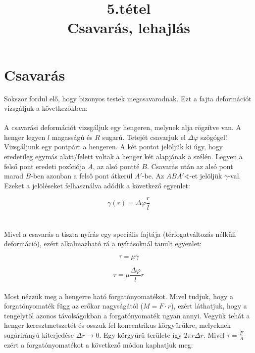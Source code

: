 \documentclass[a4paper]{article}
\title{%
  5.tétel \\
  \large Csavarás, lehajlás}
\date{}
\begin{document}
\maketitle

\section{Csavarás}

Sokszor fordul elő, hogy bizonyos testek megcsavarodnak. Ezt a fajta deformációt vizsgáljuk a következőkben:
\\
\\
A csavarási deformációt vizsgáljuk egy hengeren, melynek alja rögzítve van. A henger legyen $l$ magasságú és $R$ sugarú. Tetejét csavarjuk el $\Delta\varphi$ szögógel!
\\
Vizsgáljunk egy pontpárt a hengeren. A két pontot jelöljük ki úgy, hogy eredetileg egymás alatt/felett voltak a henger két alapjának a szélén. Legyen a felső pont eredeti pozíciója $A$, az alsó pontté $B$. Csavarás után az alsó pont marad $B$-ben azonban a felső pont átkerül $A'$-be. Az $ABA'\sphericalangle$-et jelöljük $\gamma$-val.
\\
Ezeket a jelöléseket felhasználva adódik a következő egyenlet:

\begin{equation}
	\gamma(r)=\Delta\varphi\frac{r}{l}
\end{equation}
\\
\\
Mivel a csavarás a tiszta nyírás egy speciális fajtája (térfogatváltozás nélküli deformáció), ezért alkalmazható rá a nyírásoknál tanult egyenlet: 

\begin{equation}
\tau=\mu\gamma
\end{equation}

\begin{equation}
\tau=\mu\frac{\Delta\varphi}{l}r
\end{equation}
\\
Most nézzük meg a hengerre ható forgatónyomatékot. Mivel tudjuk, hogy a forgatónyomaték függ az erőkar nagyságától ($M=F\cdot r$), ezért láthatjuk, hogy a tengelytől azonos távolságokban a forgatónyomaték ugyan annyi. Vegyük tehát a henger keresztmetszetét és osszuk fel koncentrikus körgyűrűkre, melyeknek sugárirányú kiterjedése $\Delta r\rightarrow 0$. Egy körgyűrű területe így $2\pi r\Delta r$. Mivel $\tau=\frac{F}{A}$ ezért a forgatónyomatékot a következő módon kaphatjuk meg:
\end{document}
